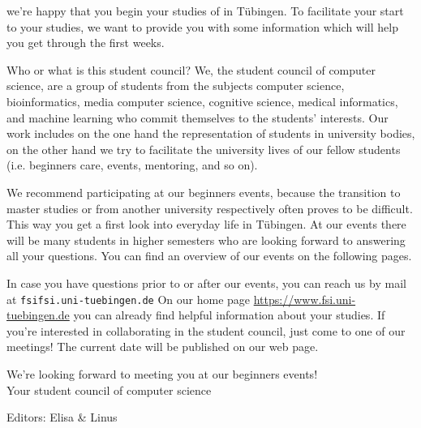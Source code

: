 \thispagestyle{firststyle}
we're happy that you begin your studies of \studiengang in Tübingen.
To facilitate your start to your studies, we want to provide you with some information which will help you get through the first weeks.

Who or what is this \glqq student council\grqq? We, the student council of computer science, are a group of students from the subjects computer science, bioinformatics, media computer science, cognitive science, medical informatics, and machine learning
who commit themselves to the students' interests. Our work includes on the one hand the representation of students in university bodies, on the other hand we try to facilitate the university lives of our fellow students (i.e. beginners care,
events, mentoring, and so on).

\ifmaster
    \ifml
We recommend participating at our beginners events, because the transition to master studies or from another university respectively often proves to be difficult. This way you get a first look into everyday life in Tübingen.
    \fi
\fi 
At our events there will be many students in higher semesters who are looking forward to answering all your questions. You can find an overview of our events on the following pages.

In case you have questions prior to or after our events, you can reach us by mail at \texttt{fsi\At fsi.uni-tuebingen.de}
On our home page
\url{https://www.fsi.uni-tuebingen.de} you can already find helpful information about your studies. If you're interested in collaborating in the student council, just come to one of our meetings! The current date will be published on our web page.

We're looking forward to meeting you at our beginners events!\\
Your student council of computer science
\par\hfill{\footnotesize Editors: Elisa \& Linus}
\vfill

